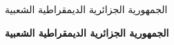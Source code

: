 \documentclass{article}
\begin{document}
\setRTL
الجمهورية الجزائرية الديمقراطية الشعبية

\textbf{الجمهورية الجزائرية الديمقراطية الشعبية}
\end{document}

